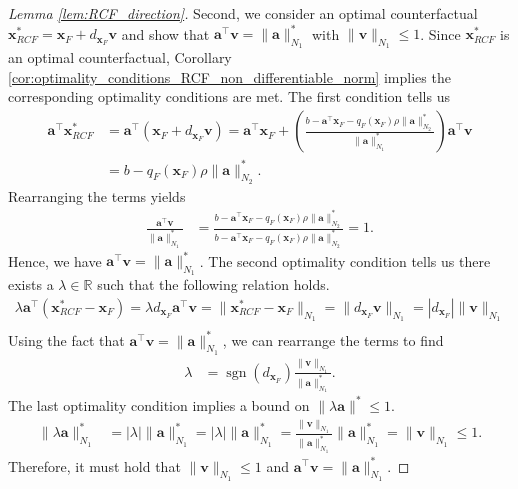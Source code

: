 \documentclass{article}
\DeclareMathOperator*{\sgn}{sgn}
\begin{document}
{\begin{proof}[Lemma \ref{lem:RCF_direction}]
    Second, we consider an optimal counterfactual $\bm{x}_{RCF}^*= \bm{x}_{F}+d_{\bm{x}_F}\bm{v}$ and show that $\bm{a}^{\top}\bm{v}=\|\bm{a}\|_{N_1}^*$ with $\|\bm{v}\|_{N_1}\leq 1$. Since $\bm{x}_{RCF}^*$ is an optimal counterfactual, Corollary \ref{cor:optimality_conditions_RCF_non_differentiable_norm} implies the corresponding optimality conditions are met. The first condition tells us
    \begin{align*}
        \bm{a}^\top \bm{x}_{RCF}^* &= \bm{a}^\top (\bm{x}_F+d_{\bm{x}_F}\bm{v})= \bm{a}^\top\bm{x}_F + \left(\frac{b-\bm{a}^{\top}\bm{x}_F - q_F(\bm{x}_F) \rho \|\bm{a}\|_{N_2}^*}{\|\bm{a}\|_{N_1}^*} \right) \bm{a}^\top \bm{v}\\
        &= b - q_F(\bm{x}_F) \rho \|\bm{a}\|_{N_2}^*.
    \end{align*}
    Rearranging the terms yields
    \begin{align*}
        \frac{\bm{a}^\top\bm{v}}{\|\bm{a}\|_{N_1}^*}&=\frac{b-\bm{a}^{\top}\bm{x}_F - q_F(\bm{x}_F) \rho \|\bm{a}\|_{N_2}^*}{b-\bm{a}^{\top}\bm{x}_F - q_F(\bm{x}_F) \rho \|\bm{a}\|_{N_2}^*}=1.
    \end{align*}
    Hence, we have $\bm{a}^\top\bm{v}=\|\bm{a}\|_{N_1}^*$. The second optimality condition tells us there exists a $\lambda\in\mathbb{R}$ such that the following relation holds.
    \begin{align*}
        \lambda \bm{a}^\top (\bm{x}_{RCF}^* - \bm{x}_F) =\lambda d_{\bm{x}_F}\bm{a}^\top\bm{v}=\|\bm{x}_{RCF}^* - \bm{x}_F\|_{N_1}=\|d_{\bm{x}_F}\bm{v}\|_{N_1}= |d_{\bm{x}_F}| \|\bm{v}\|_{N_1}\\
    \end{align*}
    Using the fact that $\bm{a}^\top\bm{v}=\|\bm{a}\|_{N_1}^*$, we can rearrange the terms to find
    \begin{align*}
        \lambda&=\sgn(d_{\bm{x}_F})\frac{\|\bm{v}\|_{N_1}}{\|\bm{a}\|_{N_1}^*}.
    \end{align*}
    The last optimality condition implies a bound on $\|\lambda \bm a\|^*\leq 1$.
    \begin{align*}
        \|\lambda \bm a\|_{N_1}^*& = |\lambda|   \|\bm{a}\|_{N_1}^* = |\lambda| \|\bm{a}\|_{N_1}^* = \frac{\|\bm{v}\|_{N_1}}{\|\bm{a}\|_{N_1}^*}\|\bm{a}\|_{N_1}^*=\|\bm{v}\|_{N_1}\leq 1.
    \end{align*}
    Therefore, it must hold that $\|\bm{v}\|_{N_1}\leq 1$ and $\bm{a}^{\top}\bm{v}=\|\bm{a}\|_{N_1}^*$.
\end{proof}


}
\end{document}

